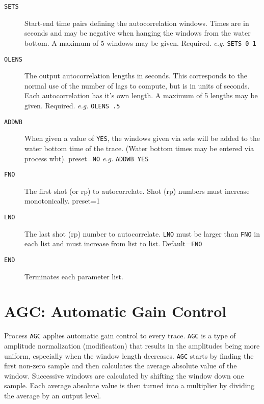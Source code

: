 \begin{description}
    \item[\texttt{SETS}] Start-end time pairs defining the autocorrelation windows.
        Times are in seconds and may be negative when hanging the
        windows from the water bottom. A maximum of 5 windows
        may be given.
        Required.    \textit{e.g.} \texttt{SETS 0 1}

    \item[\texttt{OLENS}] The output autocorrelation lengths in seconds. This
        corresponds to  the normal use of the number of lags to
        compute, but is in units of seconds. Each autocorrelation
        has it's own length. A maximum of 5 lengths may be given.
        Required.    \textit{e.g.} \texttt{OLENS .5}

    \item[\texttt{ADDWB}] When given a value of \texttt{YES}, the windows given via sets will
        be added to the water bottom time of the trace.
        (Water bottom times may be entered via process wbt).
        \Gls{preset}=\texttt{NO}     \textit{e.g.} \texttt{ADDWB YES}

    \item[\texttt{FNO}] The first \gls{shot} (or \gls{rp}) to autocorrelate. Shot (\gls{rp}) numbers must
        increase monotonically.
        \Gls{preset}=1

    \item[\texttt{LNO}] The last \gls{shot} (\gls{rp}) number to autocorrelate. \texttt{LNO} must be larger
        than \texttt{FNO} in each list and must increase from list to list.
        Default=\texttt{FNO}

    \item[\texttt{END}] Terminates each parameter list.
\end{description}

\section{AGC: Automatic Gain Control}
\label{cmd_agc}

Process \texttt{AGC} applies automatic gain control to every trace.
\texttt{AGC} is a type of amplitude normalization (modification) that results
in the amplitudes being more uniform, especially when the window length
decreases. \texttt{AGC} starts by finding the first non-zero sample and then
calculates the average absolute value of the window.  Successive windows are
calculated by shifting the window down one sample.  Each average absolute value
is then turned into a multiplier by dividing the average by an output level.


